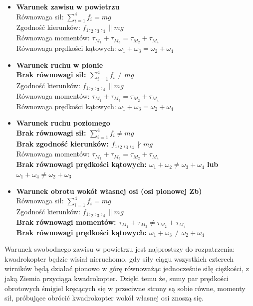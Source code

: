 \begin{itemize}
	\item \textbf{Warunek zawisu w powietrzu}\\ Równowaga sił: $\sum_{i=1}^{4} f_i = mg$ \\ Zgodność kierunków: $f_1,_2,_3,_4 \parallel mg$ \\Równowaga momentów: $ \tau_{M_1} + \tau_{M_3} = \tau_{M_2} + \tau_{M_4}$ \\ Równowaga prędkości kątowych: $\omega_1 + \omega_3 = \omega_2 + \omega_4$ \\ 
	\item \textbf{Warunek ruchu w pionie} \\ \textbf{Brak równowagi sił: $\sum_{i=1}^{4} f_i \neq mg$} \\ Zgodność kierunków: $f_1,_2,_3,_4 \parallel mg$ \\ Równowaga momentów: $\tau_{M_1} + \tau_{M_3} = \tau_{M_2} + \tau_{M_4}$ \\ Równowaga prędkości kątowych: $\omega_1 + \omega_3 = \omega_2 + \omega_4$ \\ 
	\item \textbf{Warunek ruchu poziomego} \\ \textbf{Brak równowagi sił: $\sum_{i=1}^{4} f_i \neq  mg$} \\ \textbf{Brak zgodność kierunków: $f_1,_2,_3,_4 \not\parallel mg$} \\ Równowaga momentów: $\tau_{M_1} + \tau_{M_3} = \tau_{M_2} + \tau_{M_4}$ \\ \textbf{Brak równowagi prędkości kątowych: $\omega_1 + \omega_2 \neq  \omega_3 + \omega_4$ lub $\omega_1 + \omega_4 \neq \omega_2 + \omega_3$}\\ 
	\item \textbf{Warunek obrotu wokół własnej osi (osi pionowej Zb)} \\ Równowaga sił: $\sum_{i=1}^{4} f_i = mg$ \\ Zgodność kierunków: $f_1,_2,_3,_4 \parallel mg$ \\ \textbf{Brak równowagi momentów: $\tau_{M_1} + \tau_{M_3} \neq \tau_{M_2} + \tau_{M_4}$}\\ \textbf{Brak równowagi prędkości kątowych: $\omega_1 + \omega_3 \neq  \omega_2 + \omega_4$} \\ 

\end{itemize}

Warunek swobodnego zawisu w powietrzu jest najprostszy do rozpatrzenia: kwadrokopter będzie wisiał nieruchomo, gdy siły ciągu wszystkich czterech wirników będą działać pionowo w górę równoważąc jednocześnie siłę ciężkości, z jaką Ziemia przyciąga kwadrokopter. Dzięki temu że, sumy par prędkości obrotowych śmigieł kręcących się w przeciwne strony są sobie równe, momenty sił, próbujące obrócić kwadrokopter wokół własnej osi znoszą się.


